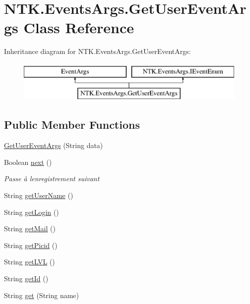 \hypertarget{class_n_t_k_1_1_events_args_1_1_get_user_event_args}{}\section{N\+T\+K.\+Events\+Args.\+Get\+User\+Event\+Args Class Reference}
\label{class_n_t_k_1_1_events_args_1_1_get_user_event_args}
Inheritance diagram for N\+T\+K.\+Events\+Args.\+Get\+User\+Event\+Args\+:\begin{figure}[H]
\begin{center}
\leavevmode
\includegraphics[height=2.000000cm]{da/d80/class_n_t_k_1_1_events_args_1_1_get_user_event_args}
\end{center}
\end{figure}
\subsection*{Public Member Functions}
\begin{DoxyCompactItemize}
\item 
\mbox{\hyperlink{class_n_t_k_1_1_events_args_1_1_get_user_event_args_adbfb4712272c7eb674afee8be6b58607}{Get\+User\+Event\+Args}} (String data)
\item 
Boolean \mbox{\hyperlink{class_n_t_k_1_1_events_args_1_1_get_user_event_args_aa281ec855499c199f6f1978e038a6134}{next}} ()
\begin{DoxyCompactList}\small\item\em Passe à l\textquotesingle{}enregistrement suivant \end{DoxyCompactList}\item 
String \mbox{\hyperlink{class_n_t_k_1_1_events_args_1_1_get_user_event_args_a96ac3d2ca2752563c3c813fea84139f8}{get\+User\+Name}} ()
\item 
String \mbox{\hyperlink{class_n_t_k_1_1_events_args_1_1_get_user_event_args_a089a7511dc3675e1be5a0708edeeb4f5}{get\+Login}} ()
\item 
String \mbox{\hyperlink{class_n_t_k_1_1_events_args_1_1_get_user_event_args_a9f1b6413920a59bbdde092e095f5c0a8}{get\+Mail}} ()
\item 
String \mbox{\hyperlink{class_n_t_k_1_1_events_args_1_1_get_user_event_args_abc4cc6dd069d3abb0c777094786b373b}{get\+Picid}} ()
\item 
String \mbox{\hyperlink{class_n_t_k_1_1_events_args_1_1_get_user_event_args_ae738402878d054da6b62b662656df909}{get\+L\+VL}} ()
\item 
String \mbox{\hyperlink{class_n_t_k_1_1_events_args_1_1_get_user_event_args_ad77e347ee23aff96adc2b4a3c9718f17}{get\+Id}} ()
\item 
String \mbox{\hyperlink{class_n_t_k_1_1_events_args_1_1_get_user_event_args_a25b949fa5067e13604f676e3d440715c}{get}} (String name)
\end{DoxyCompactItemize}


